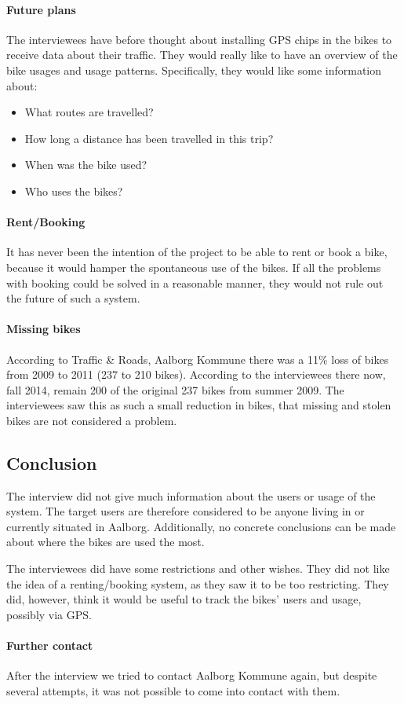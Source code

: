 \paragraph{Future plans}
The interviewees have before thought about installing GPS chips in the bikes to receive data about their traffic.
They would really like to have an overview of the bike usages and usage patterns.
Specifically, they would like some information about:
\begin{itemize}
\item What routes are travelled?
\item How long a distance has been travelled in this trip?
\item When was the bike used?
\item Who uses the bikes?
\end{itemize}

\paragraph{Rent/Booking}
It has never been the intention of the project to be able to rent or book a bike, because it would hamper the spontaneous use of the bikes.
If all the problems with booking could be solved in a reasonable manner, they would not rule out the future of such a system.

\paragraph{Missing bikes}
According to Traffic \& Roads, Aalborg Kommune\cite{cykelplanlaegning} there was a 11\% loss of bikes from 2009 to 2011 (237 to 210 bikes).
According to the interviewees there now, fall 2014, remain 200 of the original 237 bikes from summer 2009.
The interviewees saw this as such a small reduction in bikes, that missing and stolen bikes are not considered a problem.

\subsection{Conclusion}
The interview did not give much information about the users or usage of the system.
The target users are therefore considered to be anyone living in or currently situated in Aalborg.
Additionally, no concrete conclusions can be made about where the bikes are used the most.

The interviewees did have some restrictions and other wishes.
They did not like the idea of a renting/booking system, as they saw it to be too restricting.
They did, however, think it would be useful to track the bikes' users and usage, possibly via GPS.

\paragraph{Further contact}
After the interview we tried to contact Aalborg Kommune again, but despite several attempts, it was not possible to come into contact with them.
